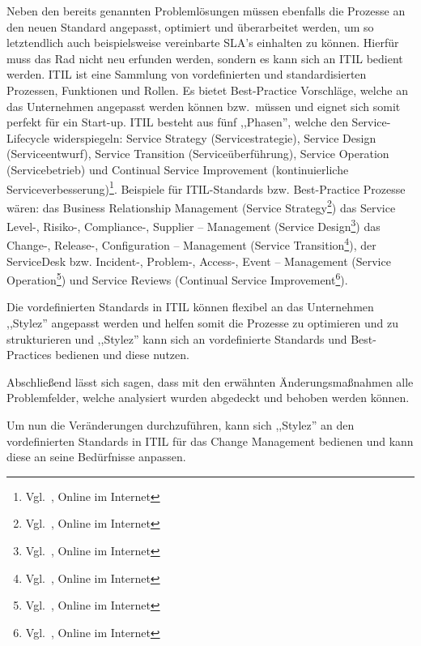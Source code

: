 Neben den bereits genannten Problemlösungen müssen ebenfalls die
Prozesse an den neuen Standard angepasst, optimiert und überarbeitet
werden, um so letztendlich auch beispielsweise vereinbarte \acrshort{SLA}’s
einhalten zu können. Hierfür muss das Rad nicht neu erfunden werden,
sondern es kann sich an ITIL bedient werden. ITIL ist eine Sammlung
von vordefinierten und standardisierten Prozessen, Funktionen und
Rollen. Es bietet Best-Practice Vorschläge, welche an das Unternehmen
angepasst werden können bzw.~müssen und eignet sich somit perfekt für
ein Start-up. ITIL besteht aus fünf ,,Phasen'', welche den
Service-Lifecycle widerspiegeln: Service Strategy (Servicestrategie),
Service Design (Serviceentwurf), Service Transition
(Serviceüberführung), Service Operation (Servicebetrieb) und Continual
Service Improvement (kontinuierliche
Serviceverbesserung)\footnote{Vgl.~\cite{ITIL-Prozesse}, Online im Internet}. Beispiele
für ITIL-Standards bzw. Best-Practice Prozesse wären: das Business
Relationship Management (Service
Strategy\footnote{Vgl.~\cite{ITIL-Service-Strategy}, Online im Internet}) das Service
Level-, Risiko-, Compliance-, Supplier – Management (Service
Design\footnote{Vgl.~\cite{ITIL-Service-Design}, Online im Internet}) das Change-,
Release-, Configuration – Management (Service
Transition\footnote{Vgl.~\cite{ITIL-Service-Transition}, Online im Internet}), der
ServiceDesk bzw. Incident-, Problem-, Access-, Event – Management
(Service Operation\footnote{Vgl.~\cite{ITIL-Service-Operation}, Online im Internet}) und
Service Reviews (Continual Service
Improvement\footnote{Vgl.~\cite{ITIL-CSI}, Online im Internet}).

Die vordefinierten Standards in ITIL können flexibel an das
Unternehmen ,,Stylez'' angepasst werden und helfen somit die Prozesse
zu optimieren und zu strukturieren und ,,Stylez'' kann sich an
vordefinierte Standards und Best-Practices bedienen und diese nutzen.

Abschließend lässt sich sagen, dass mit den erwähnten
Änderungsmaßnahmen alle Problemfelder, welche analysiert wurden
abgedeckt und behoben werden können.

Um nun die Veränderungen durchzuführen, kann sich ,,Stylez'' an den
vordefinierten Standards in ITIL für das Change Management bedienen
und kann diese an seine Bedürfnisse anpassen.
